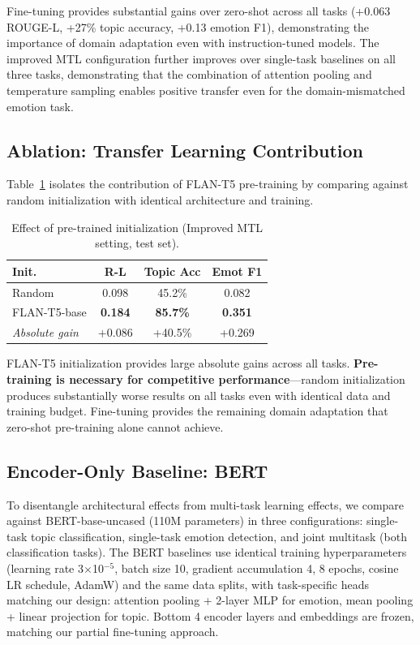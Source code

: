 \documentclass[11pt]{article}
\begin{document}
Fine-tuning provides substantial gains over zero-shot across all tasks (+0.063 ROUGE-L, +27\% topic accuracy, +0.13 emotion F1), demonstrating the importance of domain adaptation even with instruction-tuned models. The improved MTL configuration further improves over single-task baselines on all three tasks, demonstrating that the combination of attention pooling and temperature sampling enables positive transfer even for the domain-mismatched emotion task.

\subsection{Ablation: Transfer Learning Contribution}

Table~\ref{tab:transfer_ablation} isolates the contribution of FLAN-T5 pre-training by comparing against random initialization with identical architecture and training.

\begin{table}[t]
\centering
\caption{Effect of pre-trained initialization (Improved MTL setting, test set).}
\label{tab:transfer_ablation}
\small
\setlength{\tabcolsep}{4pt}
\begin{tabular}{lccc}
\toprule
\textbf{Init.} & \textbf{R-L} & \textbf{Topic Acc} & \textbf{Emot F1} \\
\midrule
Random & 0.098 & 45.2\% & 0.082 \\
FLAN-T5-base & \textbf{0.184} & \textbf{85.7\%} & \textbf{0.351} \\
\midrule
\textit{Absolute gain} & +0.086 & +40.5\% & +0.269 \\
\bottomrule
\end{tabular}
\end{table}

FLAN-T5 initialization provides large absolute gains across all tasks. \textbf{Pre-training is necessary for competitive performance}---random initialization produces substantially worse results on all tasks even with identical data and training budget. Fine-tuning provides the remaining domain adaptation that zero-shot pre-training alone cannot achieve.

\subsection{Encoder-Only Baseline: BERT}
\label{sec:bert_baseline}

To disentangle architectural effects from multi-task learning effects, we compare against BERT-base-uncased \citep{devlin2019bert} (110M parameters) in three configurations: single-task topic classification, single-task emotion detection, and joint multitask (both classification tasks). The BERT baselines use identical training hyperparameters (learning rate 3$\times$10$^{-5}$, batch size 10, gradient accumulation 4, 8 epochs, cosine LR schedule, AdamW) and the same data splits, with task-specific heads matching our design: attention pooling + 2-layer MLP for emotion, mean pooling + linear projection for topic. Bottom 4 encoder layers and embeddings are frozen, matching our partial fine-tuning approach.
\end{document}
